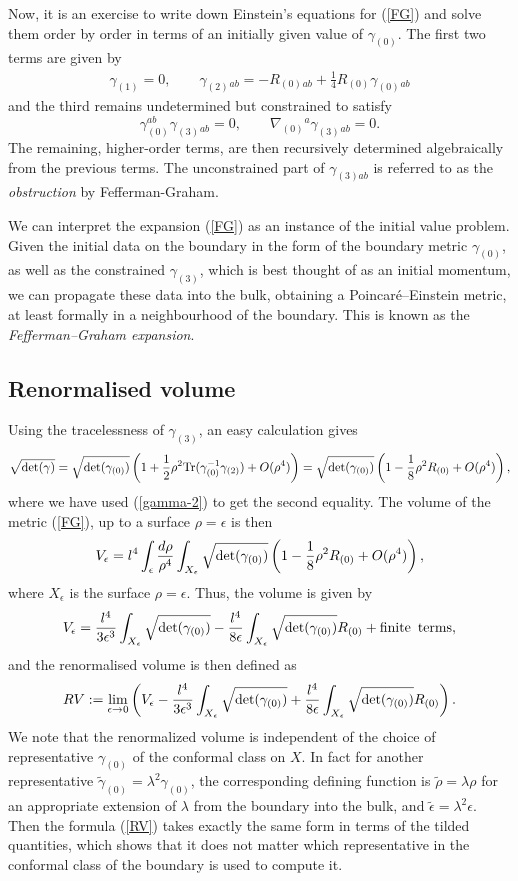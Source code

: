 \documentclass[a4paper,12pt]{article}
\newcommand{\be}{\begin{eqnarray}}
\newcommand{\ee}{\end{eqnarray}}
\begin{document}
Now, it is an exercise to write down Einstein's equations for (\ref{FG}) and solve them order by order in terms of an initially given value of $\gamma_{(0)}$. The first two terms are given by
\be\label{gamma-2}
\gamma_{(1)}=0,\qquad \gamma_{(2)}{}_{ab}=-R_{(0)}{}_{ab}+\frac{1}{4}R_{(0)}\gamma_{(0)}{}_{ab}
\ee
and the third remains undetermined but constrained to satisfy 
$$\gamma_{(0)}^{ab}\gamma_{(3)}{}_{ab}=0,\qquad \nabla_{(0)}{}^a\gamma_{(3)}{}_{ab}=0.$$
The remaining, higher-order terms, are then recursively determined algebraically from the previous terms. The unconstrained part of $\gamma_{(3)ab}$ is referred to as the {\it obstruction} by Fefferman-Graham.

We can interpret the expansion (\ref{FG}) as an instance of the initial value problem. Given the initial data on the boundary in the form of the boundary metric $\gamma_{(0)}$, as well as the constrained $\gamma_{(3)}$, which is best thought of as an initial momentum, we can propagate these data into the bulk, obtaining a Poincar\'e--Einstein metric, at least formally in a neighbourhood of the boundary. This is known as the \emph{Fefferman--Graham expansion}.

\subsection{Renormalised volume}

Using the tracelessness of $\gamma_{(3)}$, an easy calculation gives
\be\nonumber
\sqrt{{\rm det}(\gamma)} = \sqrt{{\rm det}(\gamma_{(0)})} \left( 1+\frac{1}{2} \rho^2 {\rm Tr}(\gamma_{(0)}^{-1} \gamma_{(2)})+ O(\rho^4) \right) = \sqrt{{\rm det}(\gamma_{(0)})} \left( 1-\frac{1}{8} \rho^2 R_{(0)}+ O(\rho^4)\right),
\ee
where we have used (\ref{gamma-2}) to get the second equality. The volume of the metric (\ref{FG}), up to a surface $\rho=\epsilon$ is then
\be
 V_\epsilon =  l^4 \int_\epsilon \frac{d\rho}{\rho^4} \int_{X_\epsilon} \sqrt{{\rm det}(\gamma_{(0)})} \left( 1-\frac{1}{8} \rho^2 R_{(0)}+ O(\rho^4)\right),
\ee
where ${X_\epsilon}$ is the surface $\rho=\epsilon$. Thus, the volume is given by
\be\nonumber
V_\epsilon = \frac{l^4 }{3\epsilon^3} \int_{X_\epsilon} \sqrt{{\rm det}(\gamma_{(0)})} - \frac{l^4 }{8\epsilon} \int_{X_\epsilon} \sqrt{{\rm det}(\gamma_{(0)})} R_{(0)} + {\rm finite\,\,\, terms},
\ee
and the renormalised volume is then defined as
\be\label{RV}
RV:=\lim_{\epsilon\to 0} \left(  V_\epsilon -\frac{l^4}{3\epsilon^3} \int_{X_\epsilon} \sqrt{{\rm det}(\gamma_{(0)})} + \frac{l^4}{8\epsilon} \int_{X_\epsilon} \sqrt{{\rm det}(\gamma_{(0)})} R_{(0)} \right).
\ee
We note that the renormalized volume is independent of the choice of representative $\gamma_{(0)}$ of the conformal class on $X$. In fact for another representative $\tilde \gamma_{(0)}=\lambda^{2}\gamma_{(0)}$, the corresponding defining function is $\tilde \rho=\lambda\rho$ for an appropriate extension of $\lambda$ from the boundary into the bulk, and $\tilde{\epsilon}=\lambda^2 \epsilon$. Then the formula (\ref{RV}) takes exactly the same form in terms of the tilded quantities, which shows that it does not matter which representative in the conformal class of the boundary is used to compute it. 
\end{document}
